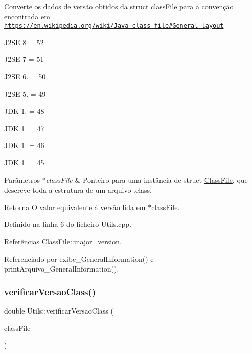 Converte os dados de versão obtidos da struct class\+File para a convenção encontrada em \href{https://en.wikipedia.org/wiki/Java_class_file#General_layout}{\tt https\+://en.\+wikipedia.\+org/wiki/\+Java\+\_\+class\+\_\+file\#\+General\+\_\+layout}

J2\+SE 8 = 52

J2\+SE 7 = 51

J2\+SE 6. = 50

J2\+SE 5. = 49

J\+DK 1. = 48

J\+DK 1. = 47

J\+DK 1. = 46

J\+DK 1. = 45 
\begin{DoxyParams}{Parâmetros}
{\em $\ast$class\+File} & Ponteiro para uma instância de struct {\ttfamily \hyperlink{classClassFile}{Class\+File}}, que descreve toda a estrutura de um arquivo .class. \\
\hline
\end{DoxyParams}
\begin{DoxyReturn}{Retorna}
O valor equivalente à versão lida em $\ast$class\+File. 
\end{DoxyReturn}


Definido na linha 6 do ficheiro Utils.\+cpp.



Referências Class\+File\+::major\+\_\+version.



Referenciado por exibe\+\_\+\+General\+Information() e print\+Arquivo\+\_\+\+General\+Information().

\mbox{\label{classUtils_a71459ff272f47bbce2081ff59fae2d2c}} 
\subsubsection{\texorpdfstring{verificar\+Versao\+Class()}{verificarVersaoClass()}}
{\footnotesize\ttfamily double Utils\+::verificar\+Versao\+Class (\begin{DoxyParamCaption}\item[{\hyperlink{classClassFile}{Class\+File} $\ast$}]{class\+File }\end{DoxyParamCaption})\hspace{0.3cm}{\ttfamily [static]}}

